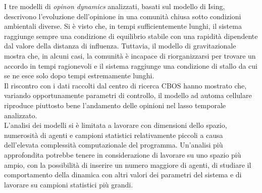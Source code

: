 \documentclass[letterpaper,10pt]{article}
\begin{document}
I tre modelli di \textit{opinon dynamics} analizzati, basati sul modello di Ising, descrivono l'evoluzione dell'opinione in una comunità chiusa sotto condizioni ambientali diverse. Si è visto che, in tempi sufficientemente lunghi, il sistema raggiunge sempre una condizione di equilibrio stabile con una rapidità dipendente dal valore della distanza di influenza. Tuttavia, il modello di  gravitazionale mostra che, in alcuni casi, la comunità è incapace di riorganizzarsi per trovare un accordo in tempi ragionevoli e il sistema raggiunge una condizione di stallo da cui se ne esce solo dopo tempi estremamente lunghi. 
\\ Il riscontro con i dati raccolti dal centro di ricerca CBOS hanno mostrato che, variando opportunamente parametri di controllo, il modello ad automa cellulare riproduce piuttosto bene l'andamento delle opinioni nel lasso temporale analizzato.
\\L'analisi dei modelli si è limitata a lavorare con dimensioni dello spazio, numerosità di agenti e campioni statistici relativamente piccoli a causa dell'elevata complessità computazionale del programma. Un'analisi più approfondita potrebbe tenere in considerazione di lavorare su uno spazio più ampio, con la possibilità di inserire un numero maggiore di agenti, di studiare il comportamento della dinamica con altri valori dei parametri del sistema e di lavorare su campioni statistici più grandi.


\label{Sec:6}


\medskip

\printbibliography[title={Bibliografia}]
\end{document}
